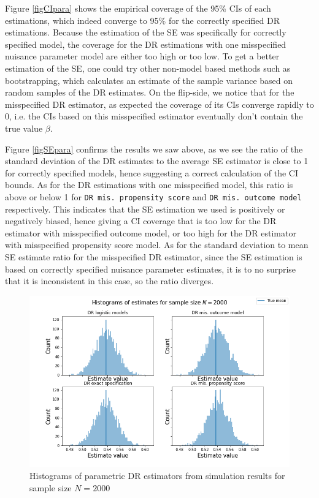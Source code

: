 \documentclass[12pt,twoside]{article}
\begin{document}
Figure \ref{figCIpara} shows the empirical coverage of the 95\% CIs of each estimations, which indeed converge to 95\% for the correctly specified DR estimations. Because the estimation of the SE was specifically for correctly specified model, the coverage for the DR estimations with one misspecified nuisance parameter model are either too high or too low. To get a better estimation of the SE, one could try other non-model based methods such as bootstrapping, which calculates an estimate of the sample variance based on random samples of the DR estimates. On the flip-side, we notice that for the misspecified DR estimator, as expected the coverage of its CIs converge rapidly to 0, i.e. the CIs based on this misspecified estimator eventually don't contain the true value $\beta$.

Figure \ref{figSEpara} confirms the results we saw above, as we see the ratio of the standard deviation of the DR estimates to the average SE estimator is close to 1 for correctly specified models, hence suggesting a correct calculation of the CI bounds. As for the DR estimations with one misspecified model, this ratio is above or below 1 for \texttt{DR mis. propensity score} and \texttt{DR mis. outcome model} respectively. This indicates that the SE estimation we used is positively or negatively biased, hence giving a CI coverage that is too low for the DR estimator with misspecified outcome model, or too high for the DR estimator with misspecified propensity score model. As for the standard deviation to mean SE estimate ratio for the misspecified DR estimator, since the SE estimation is based on correctly specified nuisance parameter estimates, it is to no surprise that it is inconsistent in this case, so the ratio diverges.

\begin{figure}[h!]
    \centering
    \includegraphics[width = 0.9\columnwidth]{figures/histpara.png}
    \caption{Histograms of parametric DR estimators from simulation results for sample size $N = 2000$}
    \label{fighistpara}
\end{figure}
\end{document}
